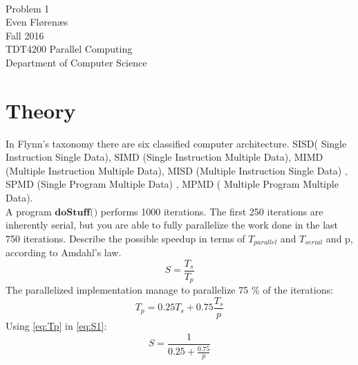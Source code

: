 \documentclass[12pt]{article}
\begin{document}
\thispagestyle{empty}
\mbox{}\\[6pc]
\begin{center}
\Huge{Problem 1}\\[2pc]

\Large{Even Flørenæs}\\[1pc]
\Large{Fall 2016}\\[2pc]

TDT4200 Parallel Computing\\
Department of Computer Science
\end{center}
\vfill

\newpage
\tableofcontents
\newpage
\section{Theory}
In Flynn's taxonomy there are six classified computer architecture. SISD( Single Instruction Single Data), SIMD (Single Instruction Multiple Data), MIMD (Multiple Instruction Multiple Data), MISD (Multiple Instruction Single Data) , SPMD (Single Program Multiple Data) , MPMD ( Multiple Program Multiple Data).
\\[10pt]
A program $\textbf{doStuff()}$ performs 1000 iterations. The first 250 iterations are inherently serial, but you are able to fully parallelize the work done in the last 750 iterations. Describe the possible speedup in terms of $T_{parallel}$ and $T_{serial}$ and p, according to Amdahl's law.
\begin{equation}\label{eq:S1}
S = \frac{T_{s}}{T_{p}}
\end{equation}
The parallelized implementation manage to parallelize 75 \% of the iterations:
\begin{equation} \label{eq:Tp}
T_p = 0.25T_s + 0.75 \frac{T_s}{p}
\end{equation}
Using \ref{eq:Tp} in \ref{eq:S1}:
\begin{equation}
S = \frac{1}{0.25 + \frac{0.75}{p}}
\end{equation}
\end{document}
